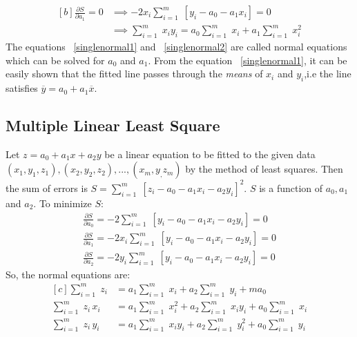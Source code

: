 \documentclass[aima203_lecturenotes_ku.tex]{subfiles}
\begin{document}
\begin{equation}
  \label{singlenormal2}
\begin{aligned}[b]
  \frac{\partial S}{\partial a_1} = 0 &\implies -2x_i\sum_{i=1}^m \; [y_i - a_0 - a_1x_i] = 0 \\[1mm]
                                      &\implies \sum_{i=1}^m \; x_iy_i = a_0\sum_{i=1}^m \;x_i + a_1 \sum_{i=1}^m \;x_i^2
\end{aligned}
\end{equation}
The equations ~\ref{singlenormal1} and ~\ref{singlenormal2} are called normal equations which can be solved for $a_0$ and $a_1$. From the equation ~\ref{singlenormal1}, it can be easily shown that the fitted line passes through the \textit{means} of $x_i$ and $y_i$,i.e the line satisfies $\overline{y} = a_0 +a_1 \overline{x}$.

\subsection{Multiple Linear Least Square}
Let $z= a_0 + a_1x+a_2y$ be a linear equation to be fitted to the given data $(x_1,y_1,z_1), (x_2,y_2,z_2),...,(x_m,y_,z_m)$ by the method of least squares. Then the sum of errors is $\displaystyle S = \sum_{i=1}^m \; [z_i - a_0 - a_1x_i-a_2y_i]^2$. $S$ is a function of $a_0, a_1$ and $a_2$. To minimize $S$:
\begin{align*}
  \frac{\partial S}{\partial a_0} = -2 \sum_{i=1}^m \; [y_i - a_0 - a_1x_i-a_2y_i] = 0 \\[1mm]
  \frac{\partial S}{\partial a_1} = -2x_i \sum_{i=1}^m \; [y_i - a_0 - a_1x_i - a_2y_i] = 0 \\[1mm]
  \frac{\partial S}{\partial a_2} = -2y_i \sum_{i=1}^m \; [y_i - a_0 - a_1x_i - a_2y_i] = 0
\end{align*}
So, the normal equations are:
\begin{equation}
  \label{multinormal}
  \begin{aligned}[c]
    \sum_{i=1}^m \; z_i &= a_1 \sum_{i=1}^m \;x_i + a_2 \sum_{i=1}^m \;y_i + ma_0 \\[1mm]
    \sum_{i=1}^m \; z_i\,x_i &= a_1 \sum_{i=1}^m \;x_i^2 + a_2 \sum_{i=1}^m \;x_iy_i + a_0 \sum_{i=1}^m\; x_i \\[1mm]
    \sum_{i=1}^m \; z_i\,y_i &= a_1 \sum_{i=1}^m \;x_iy_i + a_2 \sum_{i=1}^m \;y_i^2 + a_0 \sum_{i=1}^m\; y_i
  \end{aligned}
\end{equation}
\end{document}
